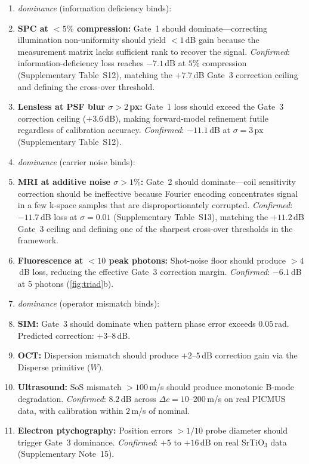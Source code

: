 \documentclass[11pt]{article}
\begin{document}
\begin{enumerate}
\item[\textit{Gate~1}] \textit{dominance} (information deficiency binds):
\item \textbf{SPC at $<5\%$ compression:} Gate~1 should dominate---correcting illumination non-uniformity should yield $<1$\,dB gain because the measurement matrix lacks sufficient rank to recover the signal. \emph{Confirmed}: information-deficiency loss reaches $-7.1$\,dB at $5\%$ compression (Supplementary Table~S12), matching the $+7.7$\,dB Gate~3 correction ceiling and defining the cross-over threshold.
\item \textbf{Lensless at PSF blur $\sigma > 2$\,px:} Gate~1 loss should exceed the Gate~3 correction ceiling ($+3.6$\,dB), making forward-model refinement futile regardless of calibration accuracy. \emph{Confirmed}: $-11.1$\,dB at $\sigma{=}3$\,px (Supplementary Table~S12).
\item[\textit{Gate~2}] \textit{dominance} (carrier noise binds):
\item \textbf{MRI at additive noise $\sigma > 1\%$:} Gate~2 should dominate---coil sensitivity correction should be ineffective because Fourier encoding concentrates signal in a few k-space samples that are disproportionately corrupted. \emph{Confirmed}: $-11.7$\,dB loss at $\sigma{=}0.01$ (Supplementary Table~S13), matching the $+11.2$\,dB Gate~3 ceiling and defining one of the sharpest cross-over thresholds in the framework.
\item \textbf{Fluorescence at $<10$ peak photons:} Shot-noise floor should produce $>4$\,dB loss, reducing the effective Gate~3 correction margin. \emph{Confirmed}: $-6.1$\,dB at 5 photons (\cref{fig:triad}b).
\item[\textit{Gate~3}] \textit{dominance} (operator mismatch binds):
\item \textbf{SIM:} Gate~3 should dominate when pattern phase error exceeds $0.05$\,rad. Predicted correction: $+3$--$8$\,dB.
\item \textbf{OCT:} Dispersion mismatch should produce $+2$--$5$\,dB correction gain via the Disperse primitive ($W$).
\item \textbf{Ultrasound:} SoS mismatch $>100$\,m/s should produce monotonic B-mode degradation. \emph{Confirmed}: $8.2$\,dB across $\Delta c = 10$--$200$\,m/s on real PICMUS data, with calibration within $2$\,m/s of nominal.
\item \textbf{Electron ptychography:} Position errors $>1/10$ probe diameter should trigger Gate~3 dominance. \emph{Confirmed}: $+5$ to $+16$\,dB on real SrTiO$_3$ data (Supplementary Note~15).

\end{enumerate}
\end{document}
